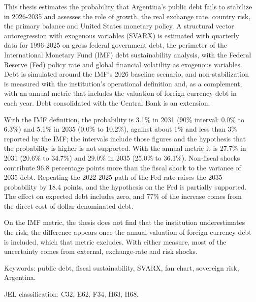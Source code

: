 This thesis estimates the probability that Argentina's public debt fails
to stabilize in 2026-2035 and assesses the role of growth, the real
exchange rate, country risk, the primary balance and United States
monetary policy. A structural vector autoregression with exogenous
variables (SVARX) is estimated with quarterly data for 1996-2025 on
gross federal government debt, the perimeter of the International
Monetary Fund (IMF) debt sustainability analysis, with the Federal
Reserve (Fed) policy rate and global financial volatility as exogenous
variables. Debt is simulated around the IMF's 2026 baseline scenario,
and non-stabilization is measured with the institution's operational
definition and, as a complement, with an annual metric that includes the
valuation of foreign-currency debt in each year. Debt consolidated with
the Central Bank is an extension.

With the IMF definition, the probability is 3.1\% in 2031 (90\%
interval: 0.0\% to 6.3\%) and 5.1\% in 2035 (0.0\% to 10.2\%), against
about 1\% and less than 3\% reported by the IMF; the intervals include
those figures and the hypothesis that the probability is higher is not
supported. With the annual metric it is 27.7\% in 2031 (20.6\% to
34.7\%) and 29.0\% in 2035 (25.0\% to 36.1\%). Non-fiscal shocks
contribute 96.8 percentage points more than the fiscal shock to the
variance of 2035 debt. Repeating the 2022-2025 path of the Fed rate
raises the 2035 probability by 18.4 points, and the hypothesis on the
Fed is partially supported. The effect on expected debt includes zero,
and 77\% of the increase comes from the direct cost of
dollar-denominated debt.

On the IMF metric, the thesis does not find that the institution
underestimates the risk; the difference appears once the annual
valuation of foreign-currency debt is included, which that metric
excludes. With either measure, most of the uncertainty comes from
external, exchange-rate and risk shocks.

Keywords: public debt, fiscal sustainability, SVARX, fan chart,
sovereign risk, Argentina.

JEL classification: C32, E62, F34, H63, H68.
